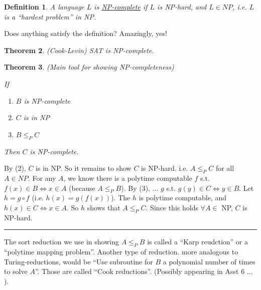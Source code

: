 \documentclass[twoside]{article}
\newcounter{lecnum}
\newtheorem{theorem}{Theorem}[lecnum]
\newtheorem{definition}[theorem]{Definition}
\newenvironment{proof}{{\bf Proof:}}{\hfill\rule{2mm}{2mm}}
\begin{document}
\begin{definition}
  A language $L$ is \underline{NP-complete} if $L$ is NP-hard, and $L \in NP$, i.e. $L$ is a ``hardest problem'' in NP.
\end{definition}

Does anything satisfy the definition? Amazingly, yes!

\begin{theorem}
  (Cook-Levin) SAT is NP-complete.
\end{theorem}

\begin{theorem}
  (Main tool for showing NP-completeness)
  
  If
  
  \begin{enumerate}
    \item $B$ is NP-complete
    \item $C$ is in NP
    \item $B \leq_{P} C$
  \end{enumerate}
  
  Then $C$ is NP-complete.
\end{theorem}

\begin{proof}
  By (2), $C$ is in NP. So it remains to show $C$ is NP-hard. i.e. $A \leq_{P} C$ for all $A \in NP$. For any $A$, we know there is a polytime computable $f$ s.t. $f(x) \in B \Leftrightarrow x \in A$ (because $A \leq_{P} B$). By (3), $\ldots$ $g$  s.t. $g(y) \in C \Leftrightarrow y \in B$. Let $h = g \circ f$ (i.e. $h(x) = g(f(x))$). The $h$ is polytime computable, and $h(x) \in C \Leftrightarrow x \in A$. So $h$ shows that $A \leq_{P} C$. Since this holds $\forall A \in$ NP, $C$ is NP-hard.
\end{proof}

The sort reduction we use in showing $A \leq_{P} B$ is called a ``Karp reudction'' or a ``polytime mapping problem''. Another type of reduction. more analogous to Turing-reductions, would be ``Use subroutine for $B$ a polynomial number of times to solve $A$''. Those are called ``Cook reductions''. (Possibly appearing in Asst 6 $\dots$).
\end{document}

